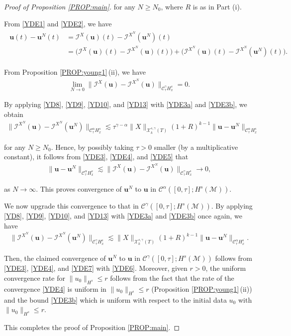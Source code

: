 \documentclass[letterpaper, 11pt,  reqno]{amsart}
\newcommand{\1}{\hspace{0.5mm}\text{I}\hspace{0.5mm}}
\newcommand{\I}{\mathcal{I}}
\newcommand{\noi}{\noindent}
\newcommand{\CC}{\mathcal{C}}
\newcommand{\al}{\alpha}
\newcommand{\g}{\gamma}
\newcommand{\les}{\lesssim}
\newcommand{\M}{\mathcal{M}}
\newcommand{\cC}{\mathcal{C}}
\newcommand{\cX}{\mathcal{X}}
\newcommand{\uu}{\mathbf{u}}
\newcommand{\too}{\longrightarrow}
\numberwithin{equation}{section}
\numberwithin{theorem}{section}
\begin{document}
\begin{proof}[Proof of Proposition \ref{PROP:main}]
\noi
for any $N \ge N_0$, where $R$ is as in Part (i).


From \eqref{YDE1} and \eqref{YDE2}, we have
\begin{align}
\label{YDE3}
\begin{split}
\uu(t) - \uu^N(t) 
& = 
 \I^{X}(\uu)(t)-  
 \I^{X^N}(\uu^N)(t)\\
& = 
\Big( \I^{X}(\uu)(t)-  
 \I^{X^N}(\uu)(t)\Big)
 + \Big(\I^{X^N}(\uu)(t)- 
 \I^{X^N}(\uu^N)(t)\Big).
\end{split}
\end{align}


\noi
From 
Proposition \ref{PROP:young1}\,(ii), 
we have 
\begin{align}
\lim_{N\to 0 }\| \I^{X}(\uu)-  
 \I^{X^N}(\uu)\|_{\CC^\g_\tau H^s_x} = 0.
\label{YDE4}
\end{align}




\noi
By applying
 \eqref{YD8}, 
\eqref{YD9}, \eqref{YD10}, and \eqref{YD13}
with \eqref{YDE3a} and \eqref{YDE3b}, 
we obtain
\begin{align}
\| \I^{X^N}(\uu)- 
 \I^{X^N}(\uu^N)\|_{\cC^\al _{\tau} H^s_x}
\les 
\tau^{\g - \al}\|X\|_{\cX^{s, \g}_k(T)}  (1+R)^{k-1}\|\uu- \uu^N \|_{\CC^\al _\tau H^s_x}
\label{YDE5}
\end{align}

\noi
for any $N \ge N_0$.
Hence, 
 by possibly taking $\tau > 0$ smaller (by a multiplicative constant), 
it follows 
from \eqref{YDE3}, 
\eqref{YDE4}, 
and \eqref{YDE5} that 
\begin{align}
\|\uu- \uu^N \|_{\CC^\al _\tau H^s_x}
\les 
\| \I^{X}(\uu)-  
 \I^{X^N}(\uu)\|_{\CC^\g_\tau H^s_x} \too 0, 
\label{YDE6}
\end{align}


\noi
as $N \to \infty$.
This proves convergence of $\uu^N$ to $\uu$ in 
 $\CC^\al([0, \tau]; H^s(\M))$.


We now upgrade this convergence to that 
 in $\CC^\g([0, \tau]; H^s(\M))$.
By applying  \eqref{YD8}, 
\eqref{YD9}, \eqref{YD10}, and \eqref{YD13}
with \eqref{YDE3a} and \eqref{YDE3b}
 once again, 
we have
\begin{align}
\| \I^{X^N}(\uu)- 
 \I^{X^N}(\uu^N)\|_{\cC^\g _{\tau} H^s_x}
\les 
\|X\|_{\cX^{s, \g}_k(T)}  (1+R)^{k-1}\|\uu- \uu^N \|_{\CC^\al _\tau H^s_x}.
\label{YDE7}
\end{align}

\noi
Then, the claimed convergence of $\uu^N$ to $\uu$ 
 in $\CC^\g([0, \tau]; H^s(\M))$
 follows from \eqref{YDE3}, 
 \eqref{YDE4}, and \eqref{YDE7} with \eqref{YDE6}. 
Moreover, given $r > 0$, 
the uniform convergence rate for $\|u_0\|_{H^s}\le r$
follows
from the fact that the 
rate of the convergence \eqref{YDE4}
is uniform in 
$\|u_0\|_{H^s}\le r$ 
(Proposition \ref{PROP:young1}\,(ii))
and the bound \eqref{YDE3b}
which is uniform with respect to the initial data
$u_0$ 
with $\|u_0\|_{H^s}\le r$.

This completes the proof of Proposition \ref{PROP:main}.
\end{proof}
\end{document}
